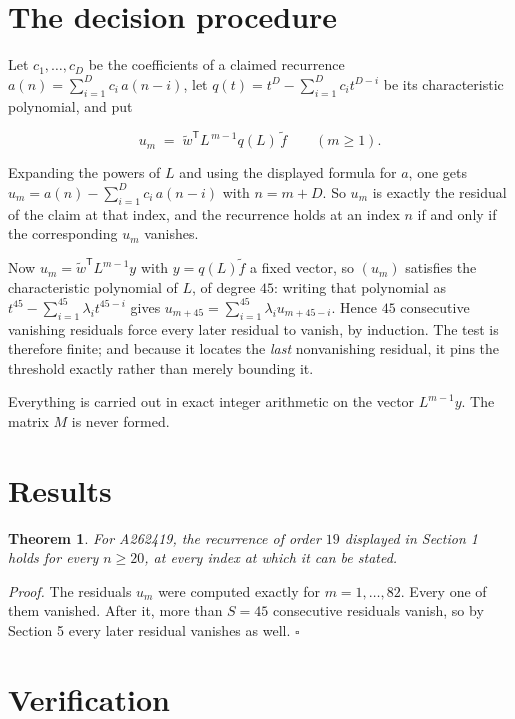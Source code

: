 \documentclass[11pt]{article}
\newtheorem{theorem}{Theorem}
\theoremstyle{definition}
\begin{document}
\section{The decision procedure}

Let $c_1,\dots,c_D$ be the coefficients of a claimed recurrence $a(n) = \sum_{i=1}^{D} c_i\,a(n-i)$, let $q(t) = t^{D} - \sum_{i=1}^{D} c_i t^{D-i}$ be its characteristic polynomial, and put

\[u_m \;=\; \tilde w^{\mathsf T} L^{\,m-1} q(L)\,\tilde f \qquad (m \ge 1).\]

Expanding the powers of $L$ and using the displayed formula for $a$, one gets $u_m = a(n) - \sum_{i=1}^{D} c_i\,a(n-i)$ with $n = m + D$. So $u_m$ is exactly the residual of the claim at that index, and the recurrence holds at an index $n$ if and only if the corresponding $u_m$ vanishes.

Now $u_m = \tilde w^{\mathsf T} L^{m-1} y$ with $y = q(L)\tilde f$ a fixed vector, so $(u_m)$ satisfies the characteristic polynomial of $L$, of degree $45$: writing that polynomial as $t^{45} - \sum_{i=1}^{45} \lambda_i t^{45-i}$ gives $u_{m+45} = \sum_{i=1}^{45} \lambda_i u_{m+45-i}$. Hence $45$ consecutive vanishing residuals force every later residual to vanish, by induction. The test is therefore finite; and because it locates the {\itshape last} nonvanishing residual, it pins the threshold exactly rather than merely bounding it.

Everything is carried out in exact integer arithmetic on the vector $L^{m-1}y$. The matrix $M$ is never formed.

\section{Results}

\begin{theorem} For A262419, the recurrence of order $19$ displayed in Section 1 holds for every $n \ge 20$, at every index at which it can be stated.\end{theorem}

{\itshape Proof.} The residuals $u_m$ were computed exactly for $m = 1,\dots,82$. Every one of them vanished. After it, more than $S = 45$ consecutive residuals vanish, so by Section 5 every later residual vanishes as well. $\square$

\section{Verification}
\end{document}
